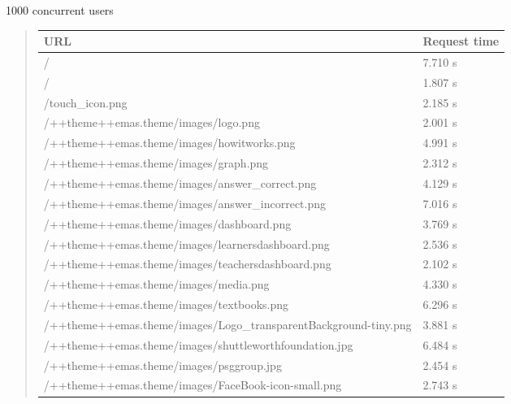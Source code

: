\documentclass[letterpaper,10pt,english]{sphinxmanual}
\begin{document}
1000 concurrent users
\begin{quote}

\begin{tabulary}{\linewidth}{|L|L|}
\hline
\textbf{\relax 
URL
} & \textbf{\relax 
Request time
}\\\hline

/
 & 
7.710 s
\\\hline

/
 & 
1.807 s
\\\hline

/touch\_icon.png
 & 
2.185 s
\\\hline

/++theme++emas.theme/images/logo.png
 & 
2.001 s
\\\hline

/++theme++emas.theme/images/howitworks.png
 & 
4.991 s
\\\hline

/++theme++emas.theme/images/graph.png
 & 
2.312 s
\\\hline

/++theme++emas.theme/images/answer\_correct.png
 & 
4.129 s
\\\hline

/++theme++emas.theme/images/answer\_incorrect.png
 & 
7.016 s
\\\hline

/++theme++emas.theme/images/dashboard.png
 & 
3.769 s
\\\hline

/++theme++emas.theme/images/learnersdashboard.png
 & 
2.536 s
\\\hline

/++theme++emas.theme/images/teachersdashboard.png
 & 
2.102 s
\\\hline

/++theme++emas.theme/images/media.png
 & 
4.330 s
\\\hline

/++theme++emas.theme/images/textbooks.png
 & 
6.296 s
\\\hline

/++theme++emas.theme/images/Logo\_transparentBackground-tiny.png
 & 
3.881 s
\\\hline

/++theme++emas.theme/images/shuttleworthfoundation.jpg
 & 
6.484 s
\\\hline

/++theme++emas.theme/images/psggroup.jpg
 & 
2.454 s
\\\hline

/++theme++emas.theme/images/FaceBook-icon-small.png
 & 
2.743 s
\\\hline


\end{tabulary}
\end{quote}
\end{document}
